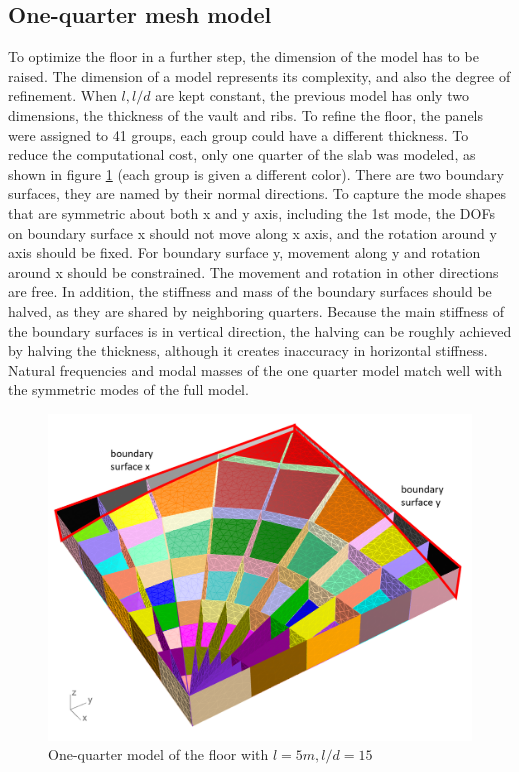 \subsection{One-quarter mesh model}
To optimize the floor in a further step, the dimension of the model has to be raised. The dimension of a model represents its complexity, and also the degree of refinement. When $l,l/d$ are kept constant, the previous model has only two dimensions, the thickness of the vault and ribs. To refine the floor, the panels were assigned to 41 groups, each group could have a different thickness. To reduce the computational cost, only one quarter of the slab was modeled, as shown in figure \ref{fig:panels_modelling} (each group is given a different color). There are two boundary surfaces, they are named by their normal directions. To capture the mode shapes that are symmetric about both x and y axis, including the 1st mode, the DOFs on boundary surface x should not move along x axis, and the rotation around y axis should be fixed. For boundary surface y, movement along y and rotation around x should be constrained. The movement and rotation in other directions are free. In addition, the stiffness and mass of the boundary surfaces should be halved, as they are shared by neighboring quarters. Because the main stiffness of the boundary surfaces is in vertical direction, the halving can be roughly achieved by halving the thickness, although it creates inaccuracy in horizontal stiffness. Natural frequencies and modal masses of the one quarter model match well with the symmetric modes of the full model.
\begin{figure}[H]
\centering
\includegraphics[width=.9\textwidth]{images/panels_modelling}
\caption{One-quarter model of the floor with $l=5m,l/d=15$}
\label{fig:panels_modelling}
\end{figure}

